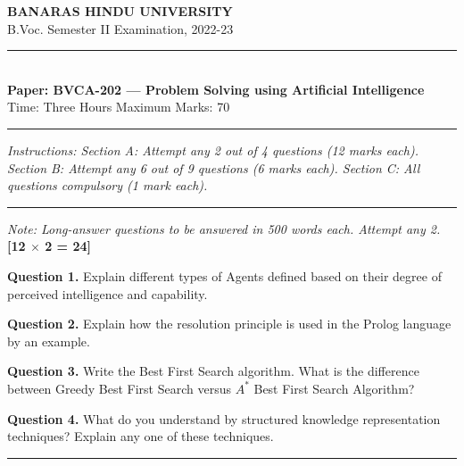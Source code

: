 \documentclass[11pt,a4paper]{article}
\begin{document}
\begin{center}
  {\large\bfseries BANARAS HINDU UNIVERSITY}\\[2pt]
  {\normalsize B.Voc. Semester II Examination, 2022-23}\\[6pt]
  \rule{0.8\linewidth}{0.5pt}\\[6pt]
  {\large\bfseries Paper: BVCA-202 --- Problem Solving using Artificial Intelligence}\\[4pt]
  {\normalsize Time: Three Hours \hfill Maximum Marks: 70}
\end{center}

\rule{\linewidth}{0.4pt}

\smallskip



\noindent   \textit{Instructions: Section A: Attempt any 2 out of 4 questions (12 marks each). Section B: Attempt any 6 out of 9 questions (6 marks each). Section C: All questions compulsory (1 mark each).}

\bigskip

\bigskip


\rule{\linewidth}{0.4pt}\smallskip




\noindent   \textit{Note: Long-answer questions to be answered in 500 words each. Attempt any 2.} \hfill   \textbf{[12 $ \times$ 2 = 24]}

\medskip


\noindent   \textbf{Question 1.} Explain different types of Agents defined based on their degree of perceived intelligence and capability.

\medskip


\noindent   \textbf{Question 2.} Explain how the resolution principle is used in the Prolog language by an example.

\medskip


\noindent   \textbf{Question 3.} Write the Best First Search algorithm. What is the difference between Greedy Best First Search versus $A^*$ Best First Search Algorithm?

\medskip


\noindent   \textbf{Question 4.} What do you understand by structured knowledge representation techniques? Explain any one of these techniques.

\bigskip


\rule{\linewidth}{0.4pt}\smallskip
\end{document}
